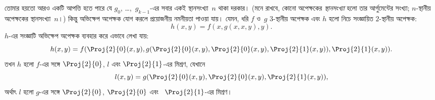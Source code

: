 \documentclass[../../../include/open-logic-section]{subfiles}
\begin{document}
তোমার হয়তো আরও একটি আপত্তি হতে পারে যে $g_0$, \dots,~$g_{k-1}$-এর
সবার একই স্থানসংখ্যা~$n$ থাকা দরকার। (মনে রাখবে, কোনো অপেক্ষকের
\emph{স্থানসংখ্যা} হলো তার আর্গুমেন্টের সংখ্যা; $n$-স্থানীয় অপেক্ষকের
স্থানসংখ্যা~$n$।) কিন্তু অভিক্ষেপ অপেক্ষক যোগ করলে প্রয়োজনীয় নমনীয়তা
পাওয়া যায়। যেমন, ধরি $f$ ও~$g$ $3$-স্থানীয় অপেক্ষক এবং $h$ হলো নিচে
সংজ্ঞায়িত $2$-স্থানীয় অপেক্ষক:
\[
h(x,y) = f(x,g(x,x,y),y).
\]
$h$-এর সংজ্ঞাটি অভিক্ষেপ অপেক্ষক ব্যবহার করে এভাবে লেখা যায়:
\[
h(x,y) = f(\Proj{2}{0}(x,y), g(\Proj{2}{0}(x,y), \Proj{2}{0}(x,y),
\Proj{2}{1}(x,y)), \Proj{2}{1}(x,y)).
\]
তখন $h$ হলো $f$-এর সঙ্গে $\Proj{2}{0}$, $l$ এবং
$\Proj{2}{1}$-এর মিশ্রণ, যেখানে
\[
l(x,y) = g(\Proj{2}{0}(x,y),\Proj{2}{0}(x,y),\Proj{2}{1}(x,y)),
\]
অর্থাৎ $l$ হলো $g$-এর সঙ্গে $\Proj{2}{0}$, $\Proj{2}{0}$ এবং
~$\Proj{2}{1}$-এর মিশ্রণ।
\end{document}
